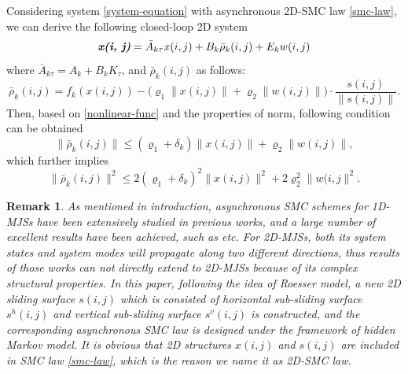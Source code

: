 \documentclass[journal,final,twocolumn]{IEEEtran}
\newtheorem{remark}{Remark}
\begin{document}
	Considering system \eqref{system-equation} with asynchronous 2D-SMC law \eqref{smc-law}, we can derive the following closed-loop 2D system 
	\begin{equation} \label{closed-loop-system-equation}
	\emph{\textbf{x(i, j)}} = \bar{A}_{k\tau }x(i,j)+B_{k}\bar{\rho}_{k}(i,j)+E_{k}w(i,j)
	\end{equation}
	where $\bar{A}_{k\tau } = A_{k}+B_{k}K_{\tau }$, and $\bar{\rho}_{k}(i,j)$ as follows:
	\begin{equation*}
	\bar\rho_{k}(i,j)=f_{k}(x(i,j))-\big(\varrho_{1}\|x(i,j)\|+\varrho_{2}\|w(i,j)\|\big)\cdot\frac{s(i,j)}{\|s(i,j)\|}.
	\end{equation*}
	Then, based on \eqref{nonlinear-func} and the properties of norm, following condition can be obtained
	\begin{equation}\label{norm-rho-inequality}
	\|\bar{\rho}_{k}(i,j)\| \leq (\varrho_{1}+\delta_{k})\|x(i,j)\| + \varrho_{2}\|w(i,j)\| ,
	\end{equation} 
	which further implies
	\begin{equation}\label{rholeseq}
	\|\bar{\rho}_{k}(i,j)\|^{2} \leq 2(\varrho_{1}+\delta_{k})^{2}\|x(i,j)\|^{2} +2\varrho_{2}^{2}\|w(i,j\|^{2} .
	\end{equation}	
		
	\begin{remark}
		As mentioned in introduction,  asynchronous SMC schemes for 1D-MJSs have been extensively studied in previous works, and a large number of excellent results have been achieved, such as \cite{song2018asynchronous,li2017passivity,qi2018observer} etc. For 2D-MJSs, both its system states and system modes will propagate along two different directions, thus results of those works can not directly extend  to 2D-MJSs because of its complex structural properties.  In this paper, following the idea of Roesser model, a new 2D sliding surface $s(i,j)$ which is consisted of horizontal sub-sliding surface $s^{h}(i,j)$ and vertical sub-sliding surface $s^{v}(i,j)$ is constructed, and the corresponding asynchronous SMC law is designed under the framework of hidden Markov model. It is obvious that 2D structures  $x(i,j)$ and $s(i,j)$ are included in SMC law \eqref{smc-law}, which is the reason we name it as 2D-SMC law.
	\end{remark}
	
\end{document}
